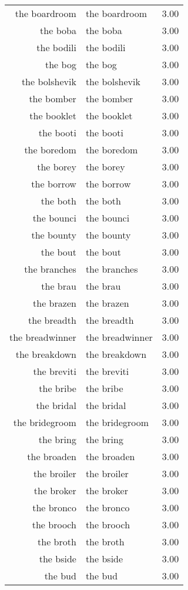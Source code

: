 \begin{table}[ht]
\begin{tabular}{rlr}
  the boardroom & the boardroom & 3.00 \\ 
  the boba & the boba & 3.00 \\ 
  the bodili & the bodili & 3.00 \\ 
  the bog & the bog & 3.00 \\ 
  the bolshevik & the bolshevik & 3.00 \\ 
  the bomber & the bomber & 3.00 \\ 
  the booklet & the booklet & 3.00 \\ 
  the booti & the booti & 3.00 \\ 
  the boredom & the boredom & 3.00 \\ 
  the borey & the borey & 3.00 \\ 
  the borrow & the borrow & 3.00 \\ 
  the both & the both & 3.00 \\ 
  the bounci & the bounci & 3.00 \\ 
  the bounty & the bounty & 3.00 \\ 
  the bout & the bout & 3.00 \\ 
  the branches & the branches & 3.00 \\ 
  the brau & the brau & 3.00 \\ 
  the brazen & the brazen & 3.00 \\ 
  the breadth & the breadth & 3.00 \\ 
  the breadwinner & the breadwinner & 3.00 \\ 
  the breakdown & the breakdown & 3.00 \\ 
  the breviti & the breviti & 3.00 \\ 
  the bribe & the bribe & 3.00 \\ 
  the bridal & the bridal & 3.00 \\ 
  the bridegroom & the bridegroom & 3.00 \\ 
  the bring & the bring & 3.00 \\ 
  the broaden & the broaden & 3.00 \\ 
  the broiler & the broiler & 3.00 \\ 
  the broker & the broker & 3.00 \\ 
  the bronco & the bronco & 3.00 \\ 
  the brooch & the brooch & 3.00 \\ 
  the broth & the broth & 3.00 \\ 
  the bside & the bside & 3.00 \\ 
  the bud & the bud & 3.00 \\ 

\end{tabular}
\end{table}
